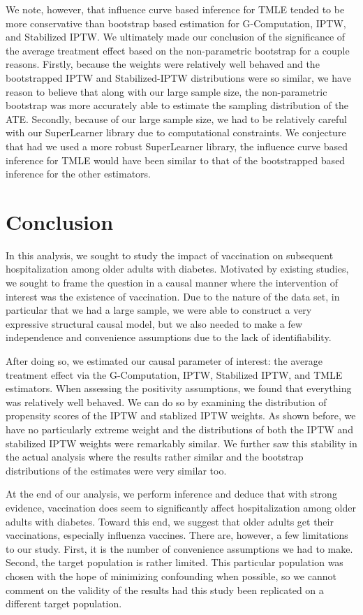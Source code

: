 \documentclass[english, 12pt]{article}
\begin{document}
We note, however, that influence curve based inference for TMLE tended to be more conservative than bootstrap based estimation for G-Computation, IPTW, and Stabilized IPTW. We ultimately made our conclusion of the significance of the average treatment effect based on the non-parametric bootstrap for a couple reasons. Firstly, because the weights were relatively well behaved and the bootstrapped IPTW and Stabilized-IPTW distributions were so similar, we have reason to believe that along with our large sample size, the non-parametric bootstrap was more accurately able to estimate the sampling distribution of the ATE. Secondly, because of our large sample size, we had to be relatively careful with our SuperLearner library due to computational constraints. We conjecture that had we used a more robust SuperLearner library, the influence curve based inference for TMLE would have been similar to that of the bootstrapped based inference for the other estimators.

\section{Conclusion}
In this analysis, we sought to study the impact of vaccination on subsequent hospitalization among older adults with diabetes. Motivated by existing studies, we sought to frame the question in a causal manner where the intervention of interest was the existence of vaccination. Due to the nature of the data set, in particular that we had a large sample, we were able to construct a very expressive structural causal model, but we also needed to make a few independence and convenience assumptions due to the lack of identifiability.

After doing so, we estimated our causal parameter of interest: the average treatment effect via the G-Computation, IPTW, Stabilized IPTW, and TMLE estimators. When assessing the positivity assumptions, we found that everything was relatively well behaved. We can do so by examining the distribution of propensity scores of the IPTW and stablized IPTW weights. As shown before, we have no particularly extreme weight and the distributions of both the IPTW and stabilized IPTW weights were remarkably similar. We further saw this stability in the actual analysis where the results rather similar and the bootstrap distributions of the estimates were very similar too.

At the end of our analysis, we perform inference and deduce that with strong evidence, vaccination does seem to significantly affect hospitalization among older adults with diabetes. Toward this end, we suggest that older adults get their vaccinations, especially influenza vaccines. There are, however, a few limitations to our study. First, it is the number of convenience assumptions we had to make. Second, the target population is rather limited. This particular population was chosen with the hope of minimizing confounding when possible, so we cannot comment on the validity of the results had this study been replicated on a different target population. 
\end{document}
